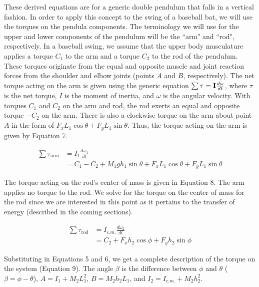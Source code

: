 \documentclass[%
 aip,
 amsmath,amssymb,
 reprint,%
 floatfix,%
]{revtex4-1}
\begin{document}
These derived equations are for a generic double pendulum that falls in a vertical fashion. In order to apply this concept to the swing of a baseball bat, we will use the torques on the pendula components. The terminology we will use for the upper and lower components of the pendulum will be the ``arm" and ``rod", respectively. In a baseball swing, we assume that the upper body musculature applies a torque $C_1$ to the arm and a torque $C_2$ to the rod of the pendulum. These torques originate from the equal and opposite muscle and joint reaction forces from the shoulder and elbow joints\cite{Cross2005} (points $A$ and $B$, respectively). The net torque acting on the arm is given using the generic equation $\sum \bold{\tau} = \bold{I} \frac{d \bold{\omega}}{dt}$, where $\tau$ is the net torque, $I$ is the moment of inertia, and $\omega$ is the angular velocity. With torques $C_1$ and $C_2$ on the arm and rod, the rod exerts an equal and opposite torque $-C_2$ on the arm. There is also a clockwise torque on the arm about point $A$ in the form of $F_x L_1 \cos{\theta} + F_y L_1 \sin{\theta}$. Thus, the torque acting on the arm is given by Equation 7.

\begin{equation}
	\begin{aligned}
		\sum \tau_{\text{arm}} & = I_1 \frac{d \omega_1}{dt} \\ 
			  & = C_1 - C_2 + M_1 g h_1 \sin{\theta} + F_x L_1 \cos{\theta} + F_y L_1 \sin{\theta}
	\end{aligned}
\end{equation}

The torque acting on the rod's center of mass is given in Equation 8. The arm applies no torque to the rod. We solve for the torque on the center of mass for the rod since we are interested in this point as it pertains to the transfer of energy (described in the coming sections).

\begin{equation}
	\begin{aligned}
		\sum \tau_{\text{rod}} & = I_{c.m.} \frac{d \omega_2}{dt} \\ 
			  & = C_2 + F_x h_2 \cos{\phi} + F_y h_2 \sin{\phi}
	\end{aligned}
\end{equation}

Substituting in Equations 5 and 6, we get a complete description of the torque on the system (Equation 9). The angle $\beta$ is the difference between $\phi$ and $\theta$ ($\beta = \phi - \theta$), $A=I_1+M_2L_1^2$, $B=M_2h_2L_1$, and $I_2=I_{c.m.}+M_2h_2^2$.
\end{document}
